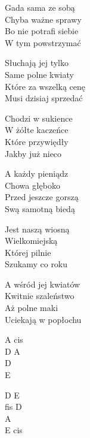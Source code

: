 \begin{text}
    Gada sama ze sobą\\
    Chyba ważne sprawy\\
    Bo nie potrafi siebie\\
    W tym powstrzymać

    Słuchają jej tylko\\
    Same polne kwiaty\\
    Które za wszelką cenę\\
    Musi dzisiaj sprzedać

    Chodzi w sukience\\
    W żółte kaczeńce\\
    Które przywiędły\\
    Jakby już nieco

    A każdy pieniądz\\
    Chowa głęboko\\
    Przed jeszcze gorszą\\
    Swą samotną biedą

    Jest naszą wiosną\\
    Wielkomiejską\\
    Której pilnie\\
    Szukamy co roku

    A wśród jej kwiatów\\
    Kwitnie szaleństwo\\
    Aż polne maki\\
    Uciekają w popłochu
\end{text}
\begin{chord}
    A cis\\
    D A\\
    D\\
    E

    D E\\
    fis D\\
    A\\
    E cis
\end{chord}